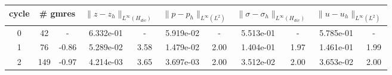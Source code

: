 \documentclass[10pt]{report}
\begin{document}
\begin{table}[H]
\begin{center}
\begin{tabular}{|c|c|c|c|c|c|c|c|c|c|c|} \hline
cycle & 
\multicolumn{2}{|c|}{\# gmres} & 
\multicolumn{2}{|c|}{$ \|z - z_h\|_{L^{\infty}(H_{div})} $} & 
\multicolumn{2}{|c|}{$ \|p - p_h\|_{L^{\infty}(L^2)} $} & 
\multicolumn{2}{|c|}{$ \|\sigma - \sigma_h\|_{L^{\infty}(H_{div})} $} & 
\multicolumn{2}{|c|}{$ \|u - u_h\|_{L^{\infty}(L^2)} $}\\ \hline
0 & 42 & - & 6.332e-01 & - & 5.919e-02 & - & 5.513e-01 & - & 5.785e-01 & -\\ \hline
1 & 76 & -0.86 & 5.289e-02 & 3.58 & 1.479e-02 & 2.00 & 1.404e-01 & 1.97 & 1.461e-01 & 1.99\\ \hline
2 & 149 & -0.97 & 4.214e-03 & 3.65 & 3.697e-03 & 2.00 & 3.512e-02 & 2.00 & 3.653e-02 & 2.00\\ \hline
\end{tabular}
\end{center}
\end{table}
\end{document}
